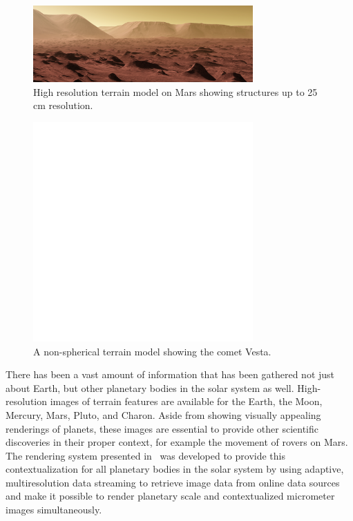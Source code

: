 \begin{figure}
\centering
\includegraphics[width=0.75\textwidth]{figures/contributions/gb/mars.png}
\caption{High resolution terrain model on Mars showing structures up to 25\,cm resolution.}
\label{contributions:astro:gb:mars}
\end{figure}

\begin{figure}
\centering
\includegraphics[width=0.75\textwidth]{figures/empty.png}
\caption{A non-spherical terrain model showing the comet Vesta.}
\label{contributions:astro:gb:vesta}
\end{figure}

There has been a vast amount of information that has been gathered not just about Earth, but other planetary bodies in the solar system as well.  High-resolution images of terrain features are available for the Earth, the Moon, Mercury, Mars, Pluto, and Charon.  Aside from showing visually appealing renderings of planets, these images are essential to provide other scientific discoveries in their proper context, for example the movement of rovers on Mars.  The rendering system presented in \paperGB\ was developed to provide this contextualization for all planetary bodies in the solar system by using adaptive, multiresolution data streaming to retrieve image data from online data sources and make it possible to render planetary scale and contextualized micrometer images simultaneously.


